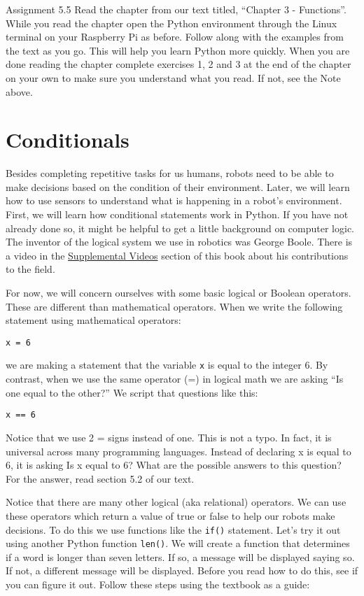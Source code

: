 \documentclass[
]{book}
\begin{document}
Assignment 5.5
Read the chapter from our text titled, ``Chapter 3 - Functions''. While you read the chapter open the Python environment through the Linux terminal on your Raspberry Pi as before. Follow along with the examples from the text as you go. This will help you learn Python more quickly. When you are done reading the chapter complete exercises 1, 2 and 3 at the end of the chapter on your own to make sure you understand what you read. If not, see the Note above.

\hypertarget{conditionals}{%
\section{Conditionals}\label{conditionals}}

Besides completing repetitive tasks for us humans, robots need to be able to make decisions based on the condition of their environment. Later, we will learn how to use sensors to understand what is happening in a robot's environment. First, we will learn how conditional statements work in Python. If you have not already done so, it might be helpful to get a little background on computer logic. The inventor of the logical system we use in robotics was George Boole. There is a video in the \protect\hyperlink{supplemental-videos}{Supplemental Videos} section of this book about his contributions to the field.

For now, we will concern ourselves with some basic logical or Boolean operators. These are different than mathematical operators. When we write the following statement using mathematical operators:

\texttt{x\ =\ 6}

we are making a statement that the variable \texttt{x} is equal to the integer 6. By contrast, when we use the same operator (=) in logical math we are asking ``Is one equal to the other?'' We script that questions like this:

\texttt{x\ ==\ 6}

Notice that we use 2 = signs instead of one. This is not a typo. In fact, it is universal across many programming languages. Instead of declaring x is equal to 6, it is asking Is x equal to 6? What are the possible answers to this question? For the answer, read section 5.2 of our text.

Notice that there are many other logical (aka relational) operators. We can use these operators which return a value of true or false to help our robots make decisions. To do this we use functions like the \texttt{if()} statement. Let's try it out using another Python function \texttt{len()}. We will create a function that determines if a word is longer than seven letters. If so, a message will be displayed saying so. If not, a different message will be displayed. Before you read how to do this, see if you can figure it out. Follow these steps using the textbook as a guide:
\end{document}
